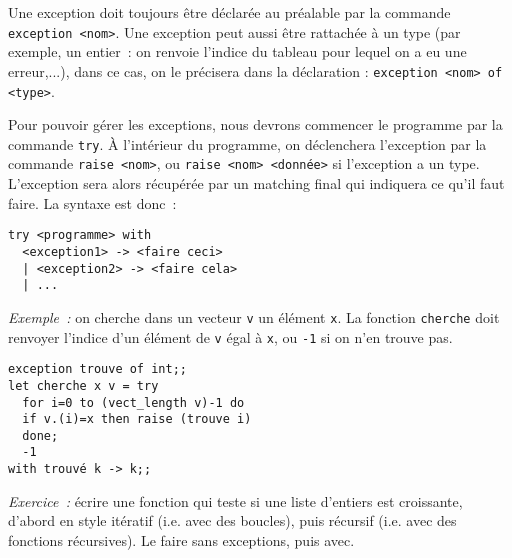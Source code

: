 \documentclass[10pt,a4paper]{article}
\begin{document}
Une exception doit toujours être déclarée au préalable par la commande \texttt{exception <nom>}. Une exception peut aussi être rattachée à un type (par exemple, un entier~: on renvoie l'indice du tableau pour lequel on a eu une erreur,...), dans ce cas, on le précisera dans la déclaration : \texttt{exception <nom> of <type>}.

Pour pouvoir gérer les exceptions, nous devrons commencer le programme par la commande \texttt{try}. À l'intérieur du programme, on déclenchera l'exception par la commande \texttt{raise <nom>}, ou \texttt{raise <nom> <donnée>} si l'exception a un type. L'exception sera alors récupérée par un matching final qui indiquera ce qu'il faut faire. La syntaxe est donc~:
\begin{verbatim}try <programme> with
  <exception1> -> <faire ceci>
  | <exception2> -> <faire cela>
  | ...
\end{verbatim}

\emph{Exemple~:} on cherche dans un vecteur \texttt{v} un élément \texttt{x}. La fonction \texttt{cherche} doit renvoyer l'indice d'un élément de \texttt{v} égal à \texttt{x}, ou \texttt{-1} si on n'en trouve pas.
\begin{verbatim}exception trouve of int;;
let cherche x v = try
  for i=0 to (vect_length v)-1 do
  if v.(i)=x then raise (trouve i)
  done;
  -1
with trouvé k -> k;;
\end{verbatim}

\emph{Exercice~:} écrire une fonction qui teste si une liste d'entiers est croissante, d'abord en style itératif (i.e. avec des boucles), puis récursif (i.e. avec des fonctions récursives). Le faire sans exceptions, puis avec.
\end{document}
